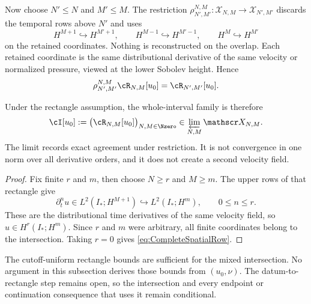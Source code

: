 Now choose \(N'\leq N\) and \(M'\leq M\).
The restriction
\(\rho_{N',M'}^{N,M}:\mathscr X_{N,M}\to\mathscr X_{N',M'}\)
discards the temporal rows above \(N'\) and uses
\[
  H^{M+1}\hookrightarrow H^{M'+1},
  \qquad
  H^{M-1}\hookrightarrow H^{M'-1},
  \qquad
  H^M\hookrightarrow H^{M'}
\]
on the retained coordinates.
Nothing is reconstructed on the overlap.
Each retained coordinate is the same distributional derivative of the same velocity or normalized pressure, viewed at the lower Sobolev height.
Hence
\begin{equation}\label{eq:BodyRectangleRestrictionCompatibility}
  \rho_{N',M'}^{N,M}\cR_{N,M}[u_0]
  =\cR_{N',M'}[u_0].
\end{equation}

Under the rectangle assumption, the whole-interval family is therefore
\begin{equation}\label{eq:DatumSpecificCompatibleIntersection}
  \cI[u_0]
  :=\bigl(\cR_{N,M}[u_0]\bigr)_{N,M\in\Nzero}
  \in\varprojlim_{N,M}\mathscr X_{N,M}.
\end{equation}
The limit records exact agreement under restriction.
It is not convergence in one norm over all derivative orders, and it does not create a second velocity field.


\begin{proof}
Fix finite \(r\) and \(m\), then choose \(N\geq r\) and \(M\geq m\).
The upper rows of that rectangle give
\[
  \partial_t^nu\in L^2(I_*;H^{M+1})
  \hookrightarrow L^2(I_*;H^m),
  \qquad 0\leq n\leq r.
\]
These are the distributional time derivatives of the same velocity field, so
\(u\in H^r(I_*;H^m)\).
Since \(r\) and \(m\) were arbitrary, all finite coordinates belong to the intersection.
Taking \(r=0\) gives \eqref{eq:CompleteSpatialRow}.
\end{proof}

The cutoff-uniform rectangle bounds are sufficient for the mixed intersection.
No argument in this subsection derives those bounds from \((u_0,\nu)\).
The datum-to-rectangle step remains open, so the intersection and every endpoint or continuation consequence that uses it remain conditional.
